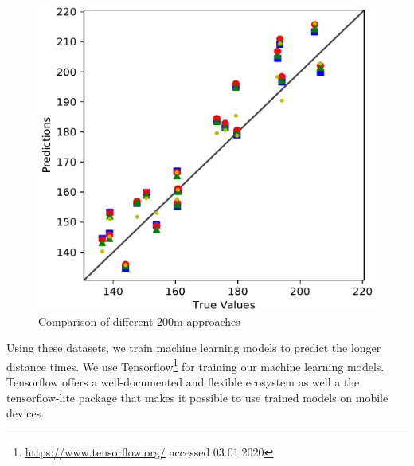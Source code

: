 \begin{figure}[ht]
\begin{minipage}{0.38\textwidth}
\includegraphics[width=\textwidth]{visualisation/eval_200m_variations.png}
\end{minipage}
\caption{Comparison of different 200m approaches}
\label{fig:200m_variations}
\end{figure}
Using these datasets, we train machine learning models to predict the longer distance times. We use Tensorflow\footnote{\url{https://www.tensorflow.org/} accessed 03.01.2020} for training our machine learning models. Tensorflow offers a well-documented and flexible ecosystem as well a the tensorflow-lite package that makes it possible to use trained models on mobile devices.\\
